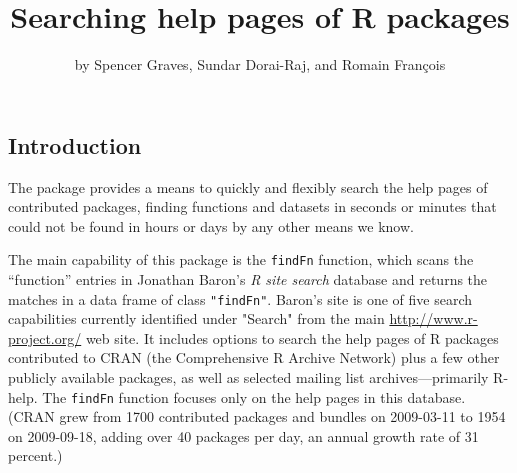 \documentclass[a4paper]{report}
\begin{document}

\begin{article}
\title{Searching help pages of R packages}
\author{by Spencer Graves, Sundar Dorai-Raj, and Romain Fran\c{c}ois}

\maketitle

\section{Introduction}
The  package provides a means to quickly and flexibly
search the help pages of contributed packages, finding
functions and datasets in seconds or minutes that could not be
found in hours or days by any other means we know.

The main capability of this package is the {\tt findFn} function,
which scans the ``function'' entries in Jonathan Baron's \emph{R site search}
database \citep{JB09URL} and returns the matches in a data frame of class
{\tt "findFn"}.  Baron's site is one of five
search capabilities currently identified under "Search" from the main
\url{http://www.r-project.org/} web site.  It includes options to
search the help pages of R packages contributed to CRAN (the
Comprehensive R Archive Network) plus a few other publicly
available packages, as well as selected mailing list archives---primarily
R-help.  The {\tt findFn} function focuses only
on the help pages in this database.  (CRAN grew from 1700 contributed
packages and bundles on 2009-03-11 to 1954 on 2009-09-18,
adding over 40 packages per day, an annual growth rate of 31 percent.)


\end{article}
\end{document}
